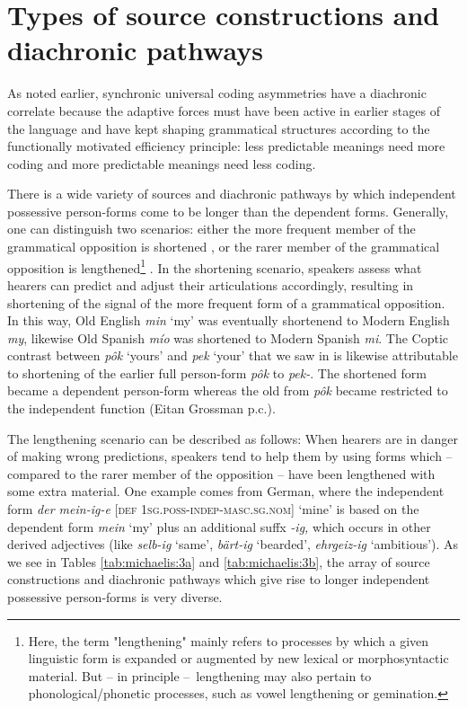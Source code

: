 \documentclass[output=paper]{langsci/langscibook}
\begin{document}
\section{Types of source constructions and diachronic pathways}

As noted earlier, synchronic universal coding asymmetries have a diachronic correlate because the adaptive forces must have been active in earlier stages of the language and have kept shaping grammatical structures according to the functionally motivated efficiency principle: less predictable meanings need more coding and more predictable meanings need less coding.

There is a wide variety of sources and diachronic pathways by which independent possessive person-forms come to be longer than the dependent forms. Generally, one can distinguish two scenarios: either the more frequent member of the grammatical opposition is shortened \citep{Bybee2007}, or the rarer member of the grammatical opposition is lengthened\footnote{Here, the term "lengthening" mainly refers to processes by which a given linguistic form is expanded or augmented by new lexical or morphosyntactic material. But – in principle –~lengthening may also pertain to phonological/phonetic processes, such as vowel lengthening or gemination.} \citep{Haspelmath2008_Econ}. In the shortening scenario, speakers assess what hearers can predict and adjust their articulations accordingly, resulting in shortening of the signal of the more frequent form of a grammatical opposition. In this way, Old English \textit{min} `my' was eventually shortenend to Modern English \textit{my}, likewise Old Spanish \textit{mío} was shortened to Modern Spanish \textit{mi}. The Coptic contrast between \textit{pôk} `yours' and \textit{pek} `your' that we saw in  is likewise attributable to shortening of the earlier full person-form \textit{pôk} to \textit{pek-}. The shortened form became a dependent person-form whereas the old from \textit{pôk} became restricted to the independent function (Eitan Grossman p.c.).

The lengthening scenario can be described as follows: When hearers are in danger of making wrong predictions, speakers tend to help them by using forms which – compared to the rarer member of the opposition – have been lengthened with some extra material. One example comes from German, where the independent form \textit{der mein-ig-e} [\textsc{def} \textsc{1sg.poss-indep-masc.sg.nom}] ‘mine’ is based on the dependent form \textit{mein} `my' plus an additional suffx \textit{{}-ig,} which occurs in other derived adjectives (like \textit{selb-ig} `same', \textit{bärt-ig} `bearded', \textit{ehrgeiz-ig} `ambitious'). As we see in Tables \ref{tab:michaelis:3a} and \ref{tab:michaelis:3b}, the array of source constructions and diachronic pathways which give rise to longer independent possessive person-forms is very diverse.
\end{document}
